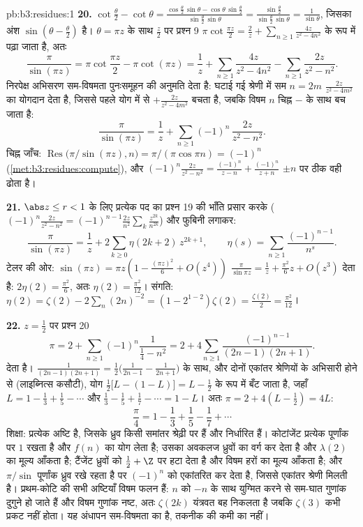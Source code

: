 \begin{solution}{pb:b3:residues:1}
\textbf{20.} $\cot\frac\theta2 - \cot\theta =
\frac{\cos\frac\theta2\,\sin\theta -
\cos\theta\,\sin\frac\theta2}{\sin\frac\theta2\,\sin\theta}
= \frac{\sin\frac\theta2}{\sin\frac\theta2\,\sin\theta} =
\frac1{\sin\theta}$, जिसका अंश $\sin(\theta -
\frac\theta2)$ है। $\theta = \pi z$ के साथ $\frac z2$ पर प्रश्न
9 $\pi\cot\frac{\pi z}2 = \frac2z +
\sum_{n\geq1}\frac{4z}{z^2 - 4n^2}$ के रूप में पढ़ा जाता है, अतः
\[
\frac{\pi}{\sin(\pi z)}
= \pi\cot\frac{\pi z}2 - \pi\cot(\pi z)
= \frac1z + \sum_{n\geq1}\frac{4z}{z^2 - 4n^2}
- \sum_{n\geq1}\frac{2z}{z^2 - n^2} .
\]
निरपेक्ष अभिसरण सम-विषमता पुनःसमूहन की अनुमति देता है: घटाई गई श्रेणी
में सम $n
= 2m$ $\frac{2z}{z^2-4m^2}$ का योगदान देता है, जिससे पहले योग में से $+\frac{2z}{z^2-4m^2}$
बचता है, जबकि विषम $n$ चिह्न $-$ के साथ बच जाता है:
\[
\frac{\pi}{\sin(\pi z)} = \frac1z +
\sum_{n\geq1}(-1)^n\,\frac{2z}{z^2 - n^2} .
\]
चिह्न जाँच: $\operatorname{Res}\bigl(\pi/\sin(\pi z),
n\bigr) = \pi/(\pi\cos\pi n) = (-1)^n$ (\cref{met:b3:residues:compute}), और $(-1)^n\frac{2z}{z^2 -
n^2} = \frac{(-1)^n}{z-n} + \frac{(-1)^n}{z+n}$ $\pm n$ पर ठीक वही  ढोता है।

\textbf{21.} $\abs z \leq r < 1$ के लिए प्रत्येक पद का प्रश्न 19 की भाँति प्रसार
करके ($(-1)^n\frac{2z}{z^2-n^2} =
(-1)^{n-1}\frac{2z}{n^2}\sum_k\frac{z^{2k}}{n^{2k}}$) और फुबिनी लगाकर:
\[
\frac{\pi}{\sin(\pi z)} = \frac1z +
2\sum_{k\geq0}\eta(2k+2)\,z^{2k+1},
\qquad
\eta(s) = \sum_{n\geq1}\frac{(-1)^{n-1}}{n^s} .
\]
टेलर की ओर: $\sin(\pi z) = \pi z(1 - \frac{(\pi z)^2}6 +
O(z^4))$ $\frac\pi{\sin\pi z} = \frac1z +
\frac{\pi^2}6z + O(z^3)$ देता है: $2\eta(2) = \frac{\pi^2}6$, अतः $\eta(2) = \frac{\pi^2}{12}$। संगति: $\eta(2) =
\zeta(2) - 2\sum_n(2n)^{-2} = (1 - 2^{1-2})\zeta(2) =
\frac{\zeta(2)}2 = \frac{\pi^2}{12}$।

\textbf{22.} $z = \frac12$ पर प्रश्न 20
\[
\pi = 2 + \sum_{n\geq1}(-1)^n\frac{1}{\frac14 - n^2}
= 2 + 4\sum_{n\geq1}\frac{(-1)^{n-1}}{(2n-1)(2n+1)} .
\]
देता है। $\frac1{(2n-1)(2n+1)} = \frac12\bigl(\frac1{2n-1} -
\frac1{2n+1}\bigr)$ के साथ, और दोनों एकांतर श्रेणियों के अभिसारी होने से
(लाइब्नित्स कसौटी), योग $\frac12\bigl[L -
(1 - L)\bigr] = L - \frac12$ के रूप में बँट जाता है, जहाँ $L = 1 - \frac13 +
\frac15 - \cdots$ और
$\frac13 - \frac15 + \frac17 - \cdots
= 1 - L$। अतः $\pi = 2 + 4(L - \frac12) = 4L$:
\[
\frac\pi4 = 1 - \frac13 + \frac15 - \frac17 + \cdots
\]
शिक्षा: प्रत्येक अष्टि  है, जिसके ध्रुव किसी समांतर श्रेढ़ी
पर हैं और  निर्धारित हैं। कोटांजेंट प्रत्येक पूर्णांक पर 
$1$ रखता है और $f(n)$ का योग लेता है; उसका अवकलज ध्रुवों का वर्ग
कर देता है और $\lambda(2)$ का मूल्य आँकता है; टैंजेंट ध्रुवों को $\frac12 + \Z$ पर
हटा देता है और विषम हरों का मूल्य आँकता है; और $\pi/\sin$ पूर्णांक ध्रुव
रखे रहता है पर  $(-1)^n$ को एकांतरित कर देता है, जिससे एकांतर
श्रेणी मिलती है। प्रथम-कोटि की सभी अष्टियाँ विषम फलन हैं: $n$ को
$-n$ के साथ युग्मित करने से सम-घात गुणांक दुगुने हो जाते हैं और
विषम गुणांक नष्ट, अतः $\zeta(2k)$ यंत्रवत बह निकलता है जबकि $\zeta(3)$ कभी
प्रकट नहीं होता। यह अंधापन सम-विषमता का है, तकनीक की कमी का नहीं।


\end{solution}
